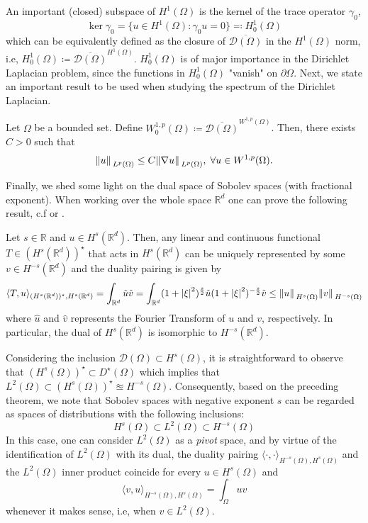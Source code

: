 An important (closed) subspace of \(H^1(\Omega)\) is the kernel of the trace operator \(\gamma_0\),
\[
    \ker \gamma_0 = \{u \in H^1(\Omega): \gamma_0 u = 0\} \eqqcolon H^1_0(\Omega)
\] 
which can be equivalently defined as the closure of \(\overline{\mathcal{D}(\Omega)}\) in the \(H^1(\Omega)\) norm, i.e,  \(H^1_0(\Omega) \coloneqq \overline{\mathcal{D}(\Omega)}^{H^1(\Omega)}\). \(H^1_0(\Omega)\) is of major importance in the Dirichlet Laplacian problem, since the functions in \(H^1_0(\Omega)\) "vanish" on \(\partial\Omega\). Next, we state an important result to be used when studying the spectrum of the Dirichlet Laplacian.
\begin{theorem}
    Let \(\Omega\) be a bounded set. Define \(W^{1, p}_0(\Omega) \coloneqq \overline{\mathcal{D}(\Omega)}^{W^{1, p}(\Omega)}\). Then, there exists \(C > 0\) such that
    \[
        \norm*{u}_{L^p(\Omega)} \leq C \norm*{\nabla u}_{L^p(\Omega)}, \; \forall u \in W^{1, p}(\Omega).
    \]
\end{theorem}

Finally, we shed some light on the dual space of Sobolev spaces (with fractional exponent). When working over the whole space \(\mathbb{R}^d\) one can prove the following result, c.f \cite{chen2010boundary} or \cite{hormander2015analysis}.
\begin{theorem}
    Let \(s \in \mathbb{R}\) and \(u \in H^s(\mathbb{R}^d)\). Then, any linear and continuous functional \(T \in (H^s(\mathbb{R}^d))^\star\) that acts in \(H^s(\mathbb{R}^d)\) can be uniquely represented by some \(v \in H^{-s}(\mathbb{R}^d)\) and the duality pairing is given by
    \[
        \langle T, u \rangle_{(H^s(\mathbb{R}^d))^\star, H^s(\mathbb{R}^d)} = \int_{\mathbb{R}^d} \hat{u}\hat{v} = \int_{\mathbb{R}^d} (1+ \abs{\xi}^2)^{\frac{s}{2}}\hat{u}(1+ \abs{\xi}^{2})^{-\frac{s}{2}}\hat{v} \leq \norm*{u}_{H^s(\Omega)}\norm*{v}_{H^{-s}(\Omega)}
    \]
    where \(\hat{u}\) and \(\hat{v}\) represents the Fourier Transform of \(u\) and \(v\), respectively. In particular, the dual of \(H^s(\mathbb{R}^d)\) is isomorphic to \(H^{-s}(\mathbb{R}^d)\).
\end{theorem}
\begin{remark}
    Considering the inclusion \(\mathcal{D}(\Omega) \subset H^s(\Omega)\), it is straightforward to observe that \((H^s(\Omega))^\star \subset D^\star(\Omega)\) which implies that \(L^2(\Omega) \subset (H^{s}(\Omega))^\star \approxeq H^{-s}(\Omega)\). Consequently, based on the preceding theorem, we note that Sobolev spaces with negative exponent \(s\) can be regarded as spaces of distributions with the following inclusions:
    \[
        H^{s}(\Omega) \subset L^2(\Omega) \subset H^{-s}(\Omega)
    \]
    In this case, one can consider \(L^2(\Omega)\) as a \textit{pivot} space, and by virtue of the identification of \(L^2(\Omega)\) with its dual, the duality pairing \(\langle \cdot, \cdot \rangle_{H^{-s}(\Omega), H^s(\Omega)}\) and the \(L^2(\Omega)\) inner product coincide for every \(u \in H^s(\Omega)\) and
    \[
        \langle v, u \rangle_{H^{-s}(\Omega), H^s(\Omega)} = \int_{\Omega} u v
    \]
    whenever it makes sense, i.e, when \(v \in L^2(\Omega)\).
\end{remark}

